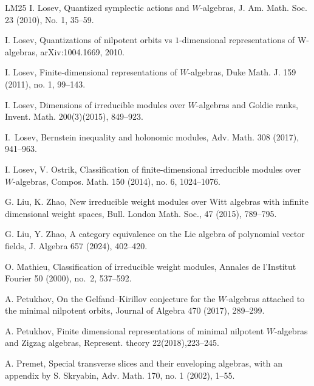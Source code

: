 \documentclass[12pt,a4paper]{amsart}
\numberwithin{equation}{section}
\theoremstyle{definition}
\theoremstyle{remark}
\begin{document}
\begin{thebibliography}{LM25}
 I. Losev,
Quantized symplectic actions and $W$-algebras,
J. Am. Math. Soc. 23 (2010), No. 1, 35--59.

 I. Losev, Quantizations of nilpotent orbits vs $1$-dimensional representations of W-algebras,
arXiv:1004.1669, 2010.

 I. Losev, Finite-dimensional representations of $W$-algebras, Duke Math. J. 159 (2011), no. 1, 99--143.

 I. Losev,  Dimensions of irreducible modules over $W $-algebras and Goldie ranks, Invent. Math. 200(3)(2015),
849--923.

I.~Losev,
 Bernstein inequality and holonomic modules,
Adv. Math.
308 (2017), 941--963.


    I. Losev, V. Ostrik, Classification of finite-dimensional irreducible modules over $W$-algebras, Compos. Math. 150 (2014), no. 6, 1024--1076.

  G. Liu, K. Zhao, New irreducible weight modules over Witt algebras with infinite
dimensional weight spaces, Bull. London Math. Soc., 47 (2015), 789--795.

 G. Liu, Y. Zhao,  A category equivalence on the Lie algebra of polynomial vector fields,  J. Algebra 657 (2024),  402--420.

O. Mathieu,
Classification of irreducible weight modules,
Annales de l'Institut Fourier 50 (2000), no.~2, 537--592.


A. Petukhov,
On the Gelfand--Kirillov conjecture for the $W$-algebras attached to the minimal nilpotent orbits,
Journal of Algebra 470 (2017), 289--299.

  A. Petukhov, Finite dimensional representations of minimal nilpotent $W$-algebras and Zigzag algebras, Represent. theory 22(2018),223--245.

  A. Premet, Special transverse slices and their enveloping algebras, with an appendix by S. Skryabin, Adv. Math. 170, no. 1 (2002), 1--55.
%


\end{thebibliography}
\end{document}
